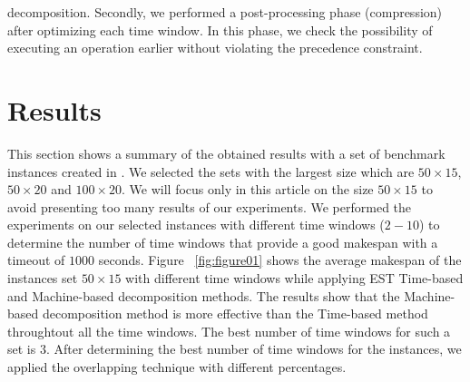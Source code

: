 \documentclass[submission,copyright,creativecommons]{eptcs}
\begin{document}
decomposition. Secondly, we performed a post-processing phase (compression) after optimizing each time window. In this phase, we check the possibility of executing an operation earlier without violating the precedence constraint.

\section{Results}
This section shows a summary of the obtained results with a set of benchmark instances created in \cite{taillard1993benchmarks}. We selected the sets with the largest size which are $50\times15$, $50\times20$ and $100\times20$. We will focus only in this article on the size $50\times15$ to avoid presenting too many results of our experiments. We performed the experiments on our selected instances with different time windows ($2 - 10$) to determine the number of time windows that provide a good makespan with a timeout of $1000$ seconds. Figure ~\ref{fig:figure01} shows the average makespan of the instances set $50\times15$ with different time windows while applying EST Time-based and Machine-based decomposition methods. The results show that the Machine-based decomposition method is more effective than the Time-based method throughtout all the time windows. The best number of time windows for such a set is $3$. After determining the best number of time windows for the instances, we applied the overlapping technique with different percentages.
\end{document}

